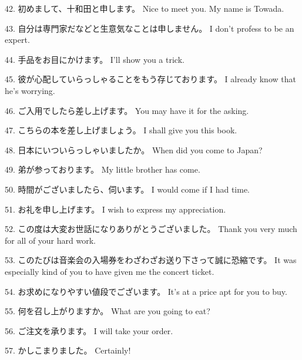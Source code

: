 \par{42. 初めまして、十和田と申します。 \hfill\break
Nice to meet you. My name is Towada. }

\par{43. 自分は専門家だなどと生意気なことは申しません。 \hfill\break
I don't profess to be an expert. }

\par{44. 手品をお目にかけます。 \hfill\break
I'll show you a trick. }

\par{45. 彼が心配していらっしゃることをもう存じております。 \hfill\break
I already know that he's worrying. }

\par{46. ご入用でしたら差し上げます。 \hfill\break
You may have it for the asking. }

\par{47. こちらの本を差し上げましょう。 \hfill\break
I shall give you this book. }

\par{48. 日本にいついらっしゃいましたか。 \hfill\break
When did you come to Japan? }

\par{49. 弟が参っております。 \hfill\break
My little brother has come. }

\par{50. 時間がございましたら、伺います。 \hfill\break
I would come if I had time. }

\par{51. お礼を申し上げます。 \hfill\break
I wish to express my appreciation. }

\par{52. この度は大変お世話になりありがとうございました。 \hfill\break
Thank you very much for all of your hard work. }

\par{53. このたびは音楽会の入場券をわざわざお送り下さって誠に恐縮です。 \hfill\break
It was especially kind of you to have given me the concert ticket. }

\par{54. お求めになりやすい値段でございます。 \hfill\break
It's at a price apt for you to buy. }

\par{55. 何を召し上がりますか。 \hfill\break
What are you going to eat? }

\par{56. ご注文を承ります。 \hfill\break
I will take your order. }

\par{57. かしこまりました。 \hfill\break
Certainly! }

